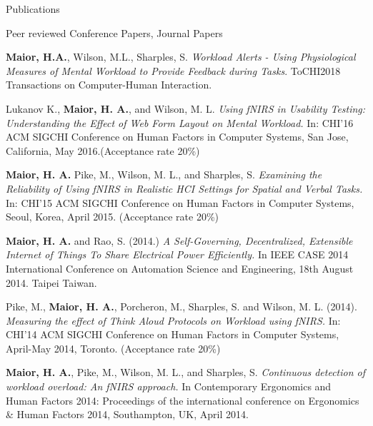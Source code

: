 \documentclass{resume} %
\begin{document}
	\vspace{-3mm}
\begin{rSection}{Publications}
\begin{rSubsection}{ }{ }{ }{Peer reviewed Conference Papers, Journal Papers}
	
\item \textbf{Maior, H.A.}, Wilson, M.L., Sharples, S. \emph{Workload Alerts - Using Physiological Measures of Mental Workload to Provide Feedback during Tasks}.  ToCHI2018 Transactions on Computer-Human Interaction.

\item Lukanov K., \textbf{Maior, H. A.}, and Wilson, M. L. \emph{Using fNIRS in Usability Testing: Understanding the Effect of Web Form Layout on Mental Workload.} In: CHI'16 ACM SIGCHI Conference on Human Factors in Computer Systems, San Jose, California, May 2016.(Acceptance rate 20\%)

\item \textbf{Maior, H. A.} Pike, M., Wilson, M. L., and Sharples, S. \emph{Examining the Reliability of Using fNIRS in Realistic HCI Settings for Spatial and Verbal Tasks.} In: CHI'15 ACM SIGCHI Conference on Human Factors in Computer Systems, Seoul, Korea, April 2015. (Acceptance rate 20\%)

\item \textbf{Maior, H. A.} and Rao, S. (2014.) \emph{A Self-Governing, Decentralized, Extensible Internet of Things To Share Electrical Power Efficiently.} In IEEE CASE 2014 International Conference on Automation Science and Engineering, 18th August 2014. Taipei Taiwan.

\item Pike, M., \textbf{Maior, H. A.}, Porcheron, M., Sharples, S. and Wilson, M. L. (2014). \emph{Measuring the effect of Think Aloud Protocols on Workload using fNIRS.} In: CHI'14 ACM SIGCHI Conference on Human Factors in Computer Systems, April-May 2014, Toronto. (Acceptance rate 20\%)

\item \textbf{Maior, H. A.}, Pike, M., Wilson, M. L., and Sharples, S. \emph{Continuous detection of workload overload: An fNIRS approach.} In Contemporary Ergonomics and Human Factors 2014: Proceedings of the international conference on Ergonomics \& Human Factors 2014, Southampton, UK, April 2014.
\end{rSubsection}


\end{rSection}
\end{document}
